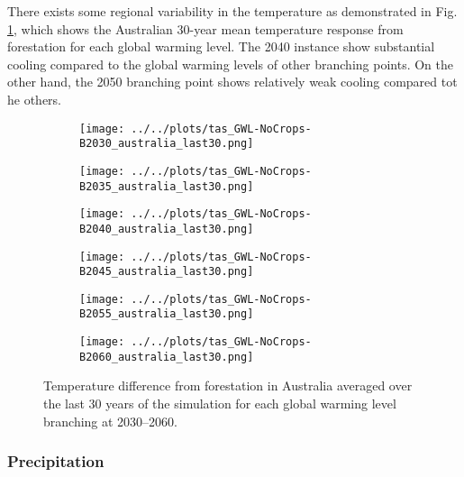 \documentclass[]{article}
\begin{document}
There exists some regional variability in the temperature as demonstrated in Fig. \ref{fig:tas_australia}, which shows the Australian 30-year mean temperature response from forestation for each global warming level.
The 2040 instance show substantial cooling compared to the global warming levels of other branching points.
On the other hand, the 2050 branching point shows relatively weak cooling compared tot he others.

\begin{figure}[H]
    \centering
    \begin{subfigure}[b]{0.4\linewidth}
        \texttt{[image: ../../plots/tas\_GWL-NoCrops-B2030\_australia\_last30.png]}
    \end{subfigure}
    \begin{subfigure}[b]{0.4\linewidth}
        \texttt{[image: ../../plots/tas\_GWL-NoCrops-B2035\_australia\_last30.png]}
    \end{subfigure}
    \begin{subfigure}[b]{0.4\linewidth}
        \texttt{[image: ../../plots/tas\_GWL-NoCrops-B2040\_australia\_last30.png]}
    \end{subfigure}
    \begin{subfigure}[b]{0.4\linewidth}
        \texttt{[image: ../../plots/tas\_GWL-NoCrops-B2045\_australia\_last30.png]}
    \end{subfigure}
    \begin{subfigure}[b]{0.4\linewidth}
        \texttt{[image: ../../plots/tas\_GWL-NoCrops-B2055\_australia\_last30.png]}
    \end{subfigure}
    \begin{subfigure}[b]{0.4\linewidth}
        \texttt{[image: ../../plots/tas\_GWL-NoCrops-B2060\_australia\_last30.png]}
    \end{subfigure}
    \caption{Temperature difference from forestation in Australia averaged over the last 30 years of the simulation for each global warming level branching at 2030–2060.
    }
    \label{fig:tas_australia}
\end{figure}

\subsubsection{Precipitation}
\end{document}
